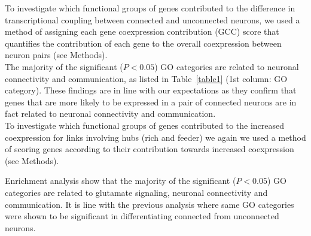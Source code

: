 \documentclass[10pt,letterpaper]{article}
\begin{document}

To investigate which functional groups of genes contributed to the difference in transcriptional coupling between connected and unconnected neurons, we used a method of assigning each gene coexpression contribution (GCC) score that quantifies the contribution of each gene to the overall coexpression between neuron pairs (see Methods).  \\

The majority of the significant ($P < 0.05$) GO categories are related to neuronal connectivity and communication, as listed in Table~\ref{table1} (1st column: GO category).
These findings are in line with our expectations as they confirm that genes that are more likely to be expressed in a pair of connected neurons are in fact related to neuronal connectivity and communication.\\

To investigate which functional groups of genes contributed to the increased coexpression for links involving hubs (rich and feeder) we again we used a method of scoring genes according to their contribution towards increased coexpression (see Methods).

Enrichment analysis show that the majority of the significant ($P < 0.05$) GO categories are related to glutamate signaling, neuronal connectivity and communication.
It is line with the previous analysis where same GO categories were shown to be significant in differentiating connected from unconnected neurons.
\end{document}
